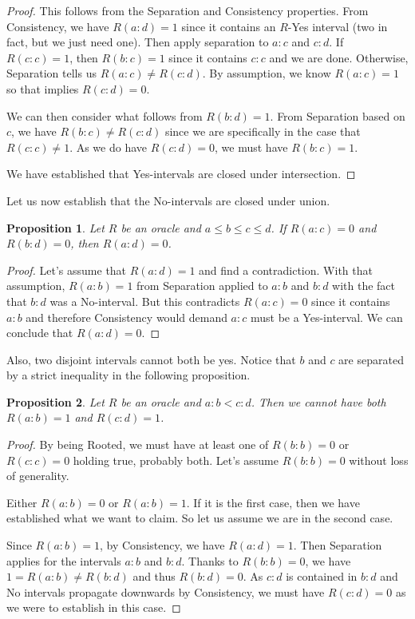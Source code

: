 \documentclass[12pt]{article}
\newtheorem{proposition}{Proposition}[subsection]
\theoremstyle{remark}
\begin{document}
\begin{proof}
  
  This follows from the Separation and Consistency properties. From Consistency, we have $R(a:d) = 1$ since it contains an $R$-Yes interval (two in fact, but we just need one). Then apply separation to $a:c$ and $c:d$. If $R(c:c) = 1$, then $R(b:c) = 1$ since it contains $c:c$ and we are done. Otherwise, Separation tells us $R(a:c) \neq R(c:d)$. By assumption, we know $R(a:c) = 1$ so that implies $R(c:d) = 0$. 
  
  We can then consider what follows from $R(b:d) = 1$.  From Separation based on $c$, we have $R(b:c) \neq R(c:d)$ since we are specifically in the case that $R(c:c) \neq 1$. As we do have $R(c:d) = 0$, we must have $R(b:c) = 1$.
  
  We have established that Yes-intervals are closed under intersection. 
\end{proof}

Let us now establish that the No-intervals are closed under union. 

\begin{proposition}\label{pr:union}
Let $R$ be an oracle and $a \leq b \leq c \leq d$.  If $R(a:c) = 0$ and $R(b:d) = 0$, then $R(a:d) = 0$. 
\end{proposition}

\begin{proof}
    Let's assume that $R(a:d) = 1$ and find a contradiction. With that assumption, $R(a:b) = 1$ from Separation applied to $a:b$ and $b:d$ with the fact that $b:d$ was a No-interval. But this contradicts $R(a:c)= 0$ since it contains $a:b$ and therefore Consistency would demand $a:c$ must be a Yes-interval. We can conclude that $R(a:d) =0$.
\end{proof}

Also, two disjoint intervals cannot both be yes. Notice that $b$ and $c$ are separated by a strict inequality in the following proposition. 

\begin{proposition} \label{pr:disjoint}
Let $R$ be an oracle and $a:b < c:d$. Then we cannot have both $R(a:b) = 1$ and $R(c:d) = 1$. 
\end{proposition}

\begin{proof}
By being Rooted, we must have at least one of $R(b:b) = 0$ or $R(c:c) = 0$ holding true, probably both. Let's assume $R(b:b) = 0$ without loss of generality.
 
Either $R(a:b) = 0$ or $R(a:b)=1$. If it is the first case, then we have established what we want to claim. So let us assume we are in the second case. 
 
Since $R(a:b) = 1$,  by Consistency, we have $R(a:d) = 1$. Then Separation applies for the intervals $a:b$ and $b:d$. Thanks to $R(b:b) = 0$, we have $1 = R(a:b) \neq R(b:d)$ and thus $R(b:d) = 0$. As $c:d$ is contained in $b:d$ and No intervals propagate downwards by Consistency, we must have $R(c:d)=0$  as we were to establish in this case. 
\end{proof}
\end{document}
